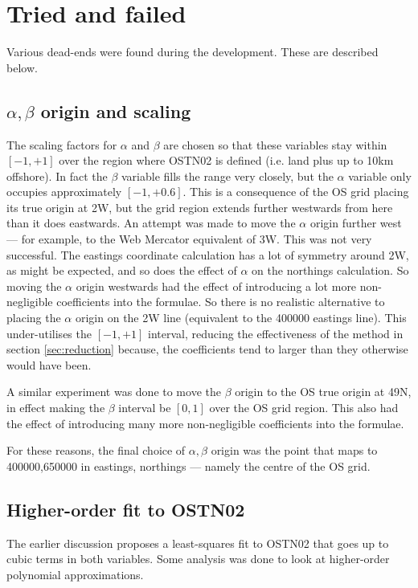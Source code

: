 \documentclass[10pt,a4paper]{article}
\begin{document}
\section {Tried and failed}

Various dead-ends were found during the development.  These are described below.

\subsection*{$\alpha,\beta$ origin and scaling}
\label{sec:ab_orig}
The scaling factors for $\alpha$ and $\beta$ are chosen so that these variables
stay within $[-1,+1]$ over the region where OSTN02 is defined (i.e. land plus
up to 10km offshore).  In fact the $\beta$ variable fills the range very
closely, but the $\alpha$ variable only occupies approximately $[-1,+0.6]$.
This is a consequence of the OS grid placing its true origin at 2\degree{}W,
but the grid region extends further westwards from here than it does eastwards.
An attempt was made to move the $\alpha$ origin further west --- for example,
to the Web Mercator equivalent of 3\degree{}W.  This was not very successful.
The eastings coordinate calculation has a lot of symmetry around 2\degree{}W,
as might be expected, and so does the effect of $\alpha$ on the northings
calculation.  So moving the $\alpha$ origin westwards had the effect of
introducing a lot more non-negligible coefficients into the formulae.  So there
is no realistic alternative to placing the $\alpha$ origin on the 2\degree{}W
line (equivalent to the 400000 eastings line).  This under-utilises the
$[-1,+1]$ interval, reducing the effectiveness of the method in section
\ref{sec:reduction} because, the coefficients tend to larger than they
otherwise would have been.

A similar experiment was done to move the $\beta$ origin to the OS true origin
at 49\degree{}N, in effect making the $\beta$ interval be $[0,1]$ over the OS
grid region.  This also had the effect of introducing many more non-negligible
coefficients into the formulae.

For these reasons, the final choice of $\alpha,\beta$ origin was the point that
maps to 400000,650000 in eastings, northings --- namely the centre of the OS
grid.

\subsection*{Higher-order fit to OSTN02}
The earlier discussion proposes a least-squares fit to OSTN02 that goes up to
cubic terms in both variables.  Some analysis was done to look at higher-order
polynomial approximations.
\end{document}

